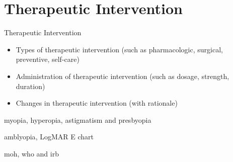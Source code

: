 \section{Therapeutic Intervention}


\begin{frame}{Therapeutic Intervention}
    \begin{itemize}
        \item Types of therapeutic intervention (such as pharmacologic, surgical, preventive, self-care)
        \item Administration of therapeutic intervention (such as dosage, strength, duration)
        \item Changes in therapeutic intervention (with rationale)
    \end{itemize}
    
    
    \gls{myopia}, \gls{hyperopia}, \gls{astigmatism} and \gls{presbyopia}
    
    \gls{amblyopia}, \gls{LogMAR E chart} 
    
    \gls{moh}, \gls{who} and \gls{irb}
\end{frame}